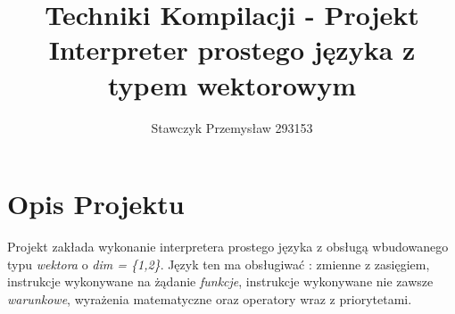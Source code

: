 \documentclass[11pt]{article} %
\title{%
	Techniki Kompilacji - Projekt \\
	\large Interpreter prostego języka z typem wektorowym
	}
\author{Stawczyk Przemysław 293153}
\date{} %
\begin{document}
\maketitle



\section{Opis Projektu}
Projekt zakłada wykonanie interpretera prostego języka z obsługą wbudowanego typu \textsl{wektora} o \textsl{dim = \{1,2\}}. Język ten ma obsługiwać : zmienne z zasięgiem, instrukcje wykonywane na żądanie \textsl{funkcje}, instrukcje wykonywane nie zawsze \textsl{warunkowe}, wyrażenia matematyczne oraz operatory wraz z priorytetami.
\end{document}
